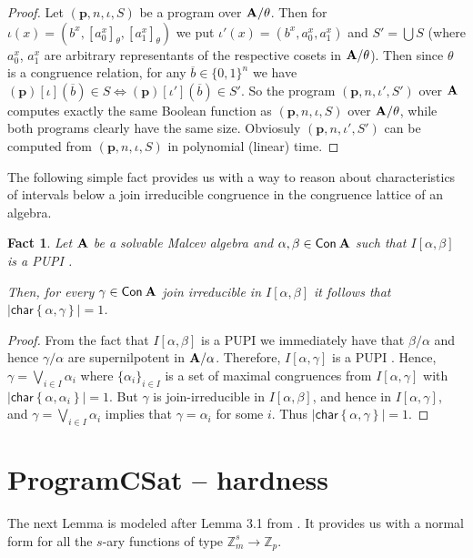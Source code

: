 \documentclass[11pt,a4paper]{amsart}
\newtheorem{fact}[lm]{Fact}
\newcommand{\m}[1]{{\uppercase {\bf{#1}}}}
\newcommand{\set}[1]{{\left\{ {#1} \right\} }}
\newcommand{\intv}[2]{I\left[#1,#2\right]}
\newcommand{\con}[1]{{\sf Con\:\m{#1}}}
\newcommand{\po}[1]{{\mathbf {#1}}}
\renewcommand{\o}[1]{\overline {#1}}
\newcommand{\map}{\longrightarrow}
\newcommand{\pupi}{PUPI }
\newcommand{\charr}{\mathsf{char}}
\newcommand{\charrset}[1]{\charr\set{#1}}
\newcommand{\z}{\mathbb{Z}}
\newcommand{\prog}[2]{\left(#1\right)\!\left[#2\right]}
\begin{document}
\begin{proof}
Let  $(\po p, n, \iota, S)$ be a program over $\m A/\theta$. Then for $\iota(x) = (b^x, [a_0^x]_{\theta}, [a_1^x]_{\theta})$ we put $\iota'(x) = (b^x, a_0^x, a_1^x)$ and $S' = \bigcup S$ (where $a_0^x$, $a_1^x$ are arbitrary representants of the respective cosets in $\m A/\theta$). Then since $\theta$ is a congruence relation, for any $\o b \in \{0,1\}^n$ we have $\prog{\po p}{\iota}(\o b) \in S \iff \prog{\po p}{\iota'}(\o b) \in S'$. So the program $(\po p, n, \iota', S')$ over $\m A$ computes exactly the same Boolean function as $(\po p, n, \iota, S)$ over $\m A/\theta$, while both programs clearly have the same size. Obviosuly $(\po p, n, \iota', S')$ can be computed from $(\po p, n, \iota, S)$ in polynomial (linear) time.

\end{proof}

The following simple fact provides us with a way to reason about characteristics of intervals below a join irreducible congruence in the congruence lattice of an algebra.

\begin{fact}\label{fact:ji-PUPI}
Let $\m A$ be a solvable Malcev algebra and $\alpha,\beta\in \con{A}$ such that $\intv{\alpha}{\beta}$ is a \pupi.

Then,  for every $\gamma\in\con{A}$ join irreducible in $\intv{\alpha}{\beta}$ it follows that $|\charrset{\alpha,\gamma}|=1$.
\end{fact}
\begin{proof}
From the fact that $\intv{\alpha}{\beta}$ is a \pupi we immediately have that $\beta/\alpha$ and hence $\gamma/\alpha$ are supernilpotent in $\m A/\alpha$. Therefore, $\intv{\alpha}{\gamma}$ is a \pupi. Hence, $\gamma=\bigvee_{i\in I}\alpha_i$ where $\{\alpha_i\}_{i\in I}$ is a set of maximal congruences from  $\intv{\alpha}{\gamma}$ with $|\charrset{\alpha,\alpha_i}|=1$. But $\gamma$ is join-irreducible in  $\intv{\alpha}{\beta}$, and hence in  $\intv{\alpha}{\gamma}$, and  $\gamma=\bigvee_{i\in I}\alpha_i$ implies that $\gamma=\alpha_i$ for some $i$. Thus $|\charrset{\alpha,\gamma}|=1$.
\end{proof}


\section{ProgramCSat -- hardness}
\label{section:hard}


The next Lemma is modeled after  Lemma 3.1 from \cite{ikk:mfcs}. It provides us with a normal form for all the $s$-ary functions of type $\z_m^s \map \z_p$.
\end{document}
